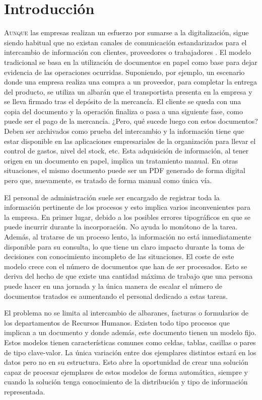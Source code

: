 
\chapter{Introducción}
\label{chap:introduccion}

\lettrine{A}{unque} las empresas realizan un esfuerzo por sumarse a la digitalización, sigue siendo habitual que no existan canales de comunicación estandarizados para el intercambio de información con clientes, proveedores o trabajadores \cite{moncloa_announcement_inversionGobierno}. El modelo tradicional se basa en la utilización de documentos en papel como base para dejar evidencia de las operaciones ocurridas. Suponiendo, por ejemplo, un escenario donde una empresa realiza una compra a un proveedor, para completar la entrega del producto, se utiliza un albarán que el transportista presenta en la empresa y se lleva firmado tras el depósito de la mercancía. El cliente se queda con una copia del documento y la operación finaliza o pasa a una siguiente fase, como puede ser el pago de la mercancía. ¿Pero, qué sucede luego con estos documentos? Deben ser archivados como prueba del intercambio y la información tiene que estar disponible en las aplicaciones empresariales de la organización para llevar el control de gastos, nivel del stock, etc. Esta adquisición de información, al tener origen en un documento en papel, implica un tratamiento manual. En otras situaciones, el mismo documento puede ser un PDF generado de forma digital pero que, nuevamente, es tratado de forma manual como única vía.

El personal de administración suele ser encargado de registrar toda la información pertinente de los procesos y esto implica varios inconvenientes para la empresa. En primer lugar, debido a los posibles errores tipográficos en que se puede incurrir durante la incorporación. No ayuda lo monótono de la tarea. Además, al tratarse de un proceso lento, la información no está inmediatamente disponible para su consulta, lo que tiene un claro impacto durante la toma de decisiones con conocimiento incompleto de las situaciones. El coste de este modelo crece con el número de documentos que han de ser procesados. Esto se deriva del hecho de que existe una cantidad máxima de trabajo que una persona puede hacer en una jornada y la única manera de escalar el número de documentos tratados es aumentando el personal dedicado a estas tareas.

El problema no se limita al intercambio de albaranes, facturas o formularios de los departamentos de Recursos Humanos. Existen todo tipo procesos que implican a un documento y donde además, este documento tienen un modelo fijo. Estos modelos tienen características comunes como celdas, tablas, casillas o pares de tipo clave-valor. La única variación entre dos ejemplares distintos estará en los datos pero no en su estructura. Esto abre la oportunidad de crear una solución capaz de procesar ejemplares de estos modelos de forma automática, siempre y cuando la solución tenga conocimiento de la distribución y tipo de información representada. 

